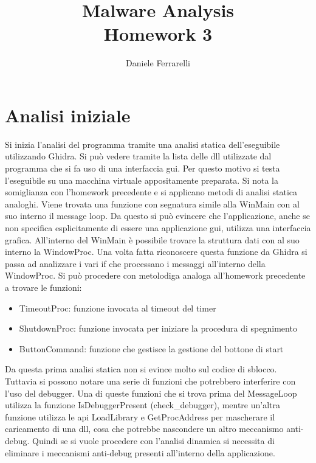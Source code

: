 \documentclass[a4paper,10pt]{article}
\title{Malware Analysis \\ \large Homework 3}
\author{Daniele Ferrarelli}
\date{}
\begin{document}
\maketitle

\section{Analisi iniziale}
Si inizia l'analisi del programma tramite una analisi statica dell'eseguibile utilizzando Ghidra. Si può vedere tramite la lista delle dll utilizzate dal programma che si fa uso di una interfaccia gui. Per questo motivo si testa l'eseguibile su una macchina virtuale appositamente preparata. Si nota la somiglianza con l'homework precedente e si applicano metodi di analisi statica analoghi. Viene trovata una funzione con segnatura simile alla WinMain con al suo interno il message loop. Da questo si può evincere che l'applicazione, anche se non specifica esplicitamente di essere una applicazione gui, utilizza una interfaccia grafica. All'interno del WinMain è possibile trovare la struttura dati con al suo interno la WindowProc. Una volta fatta riconoscere questa funzione da Ghidra si passa ad analizzare i vari if che processano i messaggi all'interno della WindowProc. Si può procedere con metolodiga analoga all'homework precedente a trovare le funzioni:
\begin{itemize}
\item TimeoutProc: funzione invocata al timeout del timer
\item ShutdownProc: funzione invocata per iniziare la procedura di spegnimento
\item ButtonCommand: funzione che gestisce la gestione del bottone di start
\end{itemize}
Da questa prima analisi statica non si evince molto sul codice di sblocco. Tuttavia si possono notare una serie di funzioni che potrebbero interferire con l'uso del debugger. Una di queste funzioni che si trova prima del MessageLoop utilizza la funzione IsDebuggerPresent (check\_debugger), mentre un'altra funzione utilizza le api LoadLibrary e GetProcAddress per mascherare il caricamento di una dll, cosa che potrebbe nascondere un altro meccanismo anti-debug. Quindi se si vuole procedere con l'analisi dinamica si necessita di eliminare i meccanismi anti-debug presenti all'interno della applicazione. 
\end{document}
